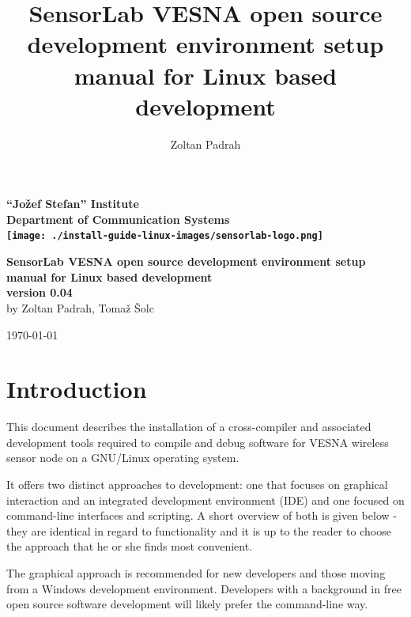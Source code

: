 \documentclass[a4paper, 10pt]{article}
\title{SensorLab VESNA open source development environment setup manual for Linux based development}
\author{Zoltan Padrah}
\begin{document}
\begin{titlepage}
    \begin{center}
    \textbf{
        \Large ``Jožef Stefan'' Institute \\[2mm]
        Department of Communication Systems\\[2mm]
        \texttt{[image: ./install-guide-linux-images/sensorlab-logo.png]}
        }\\

    \vfill

    \textbf{\huge SensorLab VESNA open source development environment setup manual
        for Linux based development}\\[1.5cm]


    \textbf{ \Large
    version 0.04}\\[1cm]

    \textnormal{\Large
    by Zoltan Padrah, Tomaž Šolc}\\[1cm]

    \vfill

    \textnormal{\large
    \today\\[1cm]
    }
    \end{center}
\end{titlepage}


\section{Introduction}

This document describes the installation of a cross-compiler and associated
development tools required to compile and debug software for VESNA wireless
sensor node on a GNU/Linux operating system.

It offers two distinct approaches to development: one that focuses on graphical
interaction and an integrated development environment (IDE) and one focused on
command-line interfaces and scripting. A short overview of both is given below
- they are identical in regard to functionality and it is up to the reader to
choose the approach that he or she finds most convenient.

The graphical approach is recommended for new developers and those moving from a
Windows development environment. Developers with a background in free open
source software development will likely prefer the command-line way.
\end{document}
